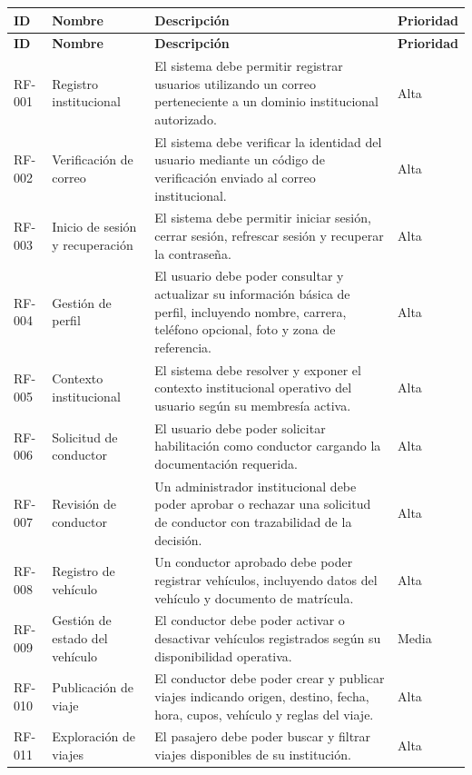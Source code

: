 \documentclass{article}
\begin{document}
\begin{longtable}{|P{1.8cm}|P{3.8cm}|P{7.2cm}|P{2.2cm}|}
\hline
{}
\textbf{ID} & \textbf{Nombre} & \textbf{Descripción} & \textbf{Prioridad} \\
\hline
\endfirsthead
\hline
{}
\textbf{ID} & \textbf{Nombre} & \textbf{Descripción} & \textbf{Prioridad} \\
\hline
\endhead
RF-001 & Registro institucional & El sistema debe permitir registrar usuarios utilizando un correo perteneciente a un dominio institucional autorizado. & Alta \\
\hline
RF-002 & Verificación de correo & El sistema debe verificar la identidad del usuario mediante un código de verificación enviado al correo institucional. & Alta \\
\hline
RF-003 & Inicio de sesión y recuperación & El sistema debe permitir iniciar sesión, cerrar sesión, refrescar sesión y recuperar la contraseña. & Alta \\
\hline
RF-004 & Gestión de perfil & El usuario debe poder consultar y actualizar su información básica de perfil, incluyendo nombre, carrera, teléfono opcional, foto y zona de referencia. & Alta \\
\hline
RF-005 & Contexto institucional & El sistema debe resolver y exponer el contexto institucional operativo del usuario según su membresía activa. & Alta \\
\hline
RF-006 & Solicitud de conductor & El usuario debe poder solicitar habilitación como conductor cargando la documentación requerida. & Alta \\
\hline
RF-007 & Revisión de conductor & Un administrador institucional debe poder aprobar o rechazar una solicitud de conductor con trazabilidad de la decisión. & Alta \\
\hline
RF-008 & Registro de vehículo & Un conductor aprobado debe poder registrar vehículos, incluyendo datos del vehículo y documento de matrícula. & Alta \\
\hline
RF-009 & Gestión de estado del vehículo & El conductor debe poder activar o desactivar vehículos registrados según su disponibilidad operativa. & Media \\
\hline
RF-010 & Publicación de viaje & El conductor debe poder crear y publicar viajes indicando origen, destino, fecha, hora, cupos, vehículo y reglas del viaje. & Alta \\
\hline
RF-011 & Exploración de viajes & El pasajero debe poder buscar y filtrar viajes disponibles de su institución. & Alta \\

\end{longtable}
\end{document}
